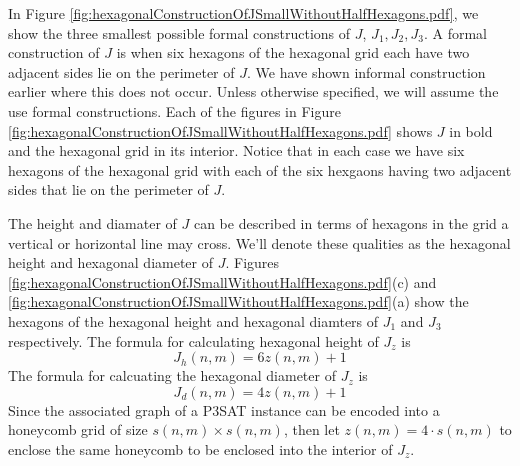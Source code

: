 \documentclass[10pt]{CSUNthesis}
\theoremstyle{plain}%
\theoremstyle{definition}
\theoremstyle{remark}
\begin{document}
In Figure \ref{fig:hexagonalConstructionOfJSmallWithoutHalfHexagons.pdf}, we show the three smallest possible formal constructions of $J$, $J_1, J_2, J_3$.  
A formal construction of $J$ is when six hexagons of the hexagonal grid each have two adjacent sides lie on the perimeter of $J$.
We have shown informal construction earlier where this does not occur.
Unless otherwise specified, we will assume the use formal constructions.
Each of the figures in Figure \ref{fig:hexagonalConstructionOfJSmallWithoutHalfHexagons.pdf} shows $J$ in bold and the hexagonal grid in its interior.
Notice that in each case we have six hexagons of the hexagonal grid with each of the six hexgaons having two adjacent sides that lie on the perimeter of $J$.

The height and diamater of $J$ can be described in terms of hexagons in the grid a vertical or horizontal line may cross. 
We'll denote these qualities as the hexagonal height and hexagonal diameter of $J$.  
Figures \ref{fig:hexagonalConstructionOfJSmallWithoutHalfHexagons.pdf}(c) and \ref{fig:hexagonalConstructionOfJSmallWithoutHalfHexagons.pdf}(a) show the hexagons of the hexagonal height and hexagonal diamters of $J_1$ and $J_3$ respectively.  
The formula for calculating hexagonal height of $J_z$ is 
\begin{equation}\label{eqn:Jh}
J_h (n,m) = 6z(n,m)+1
\end{equation}
The formula for calcuating the hexagonal diameter of $J_z$ is 
\begin{equation}\label{eqn:Jd}
J_d (n,m) = 4z(n,m)+1
\end{equation}
Since the associated graph of a P3SAT instance can be encoded into a honeycomb grid of size $s(n,m) \times s(n,m)$, then let $z(n,m)=4\cdot s(n,m)$ to enclose the same honeycomb to be enclosed into the interior of $J_z$.
\end{document}
